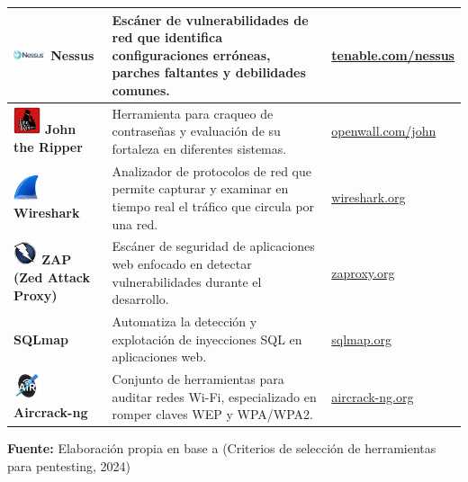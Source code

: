 \documentclass[a4paper, 10pt]{article}
\begin{document}
\begin{table}[H]
\begin{tabular}{|m{5cm}|m{8cm}|m{3.5cm}|}
        \hline
        \includegraphics[width=0.95cm]{images/nessus.png} \textbf{Nessus} & Escáner de vulnerabilidades de red que identifica configuraciones erróneas, parches faltantes y debilidades comunes. & \href{https://www.tenable.com/products/nessus}{tenable.com/nessus} \\
        \hline
        \includegraphics[width=0.8cm]{images/john.png} \textbf{John the Ripper} & Herramienta para craqueo de contraseñas y evaluación de su fortaleza en diferentes sistemas. & \href{https://www.openwall.com/john}{openwall.com/john} \\
        \hline
        \includegraphics[width=0.75cm]{images/wireshark.png} \textbf{Wireshark} & Analizador de protocolos de red que permite capturar y examinar en tiempo real el tráfico que circula por una red. & \href{https://www.wireshark.org}{wireshark.org} \\
        \hline
        \includegraphics[width=0.7cm]{images/zap.jpeg} \textbf{ZAP (Zed Attack Proxy)} & Escáner de seguridad de aplicaciones web enfocado en detectar vulnerabilidades durante el desarrollo. & \href{https://www.zaproxy.org}{zaproxy.org} \\
        \hline
        \textbf{SQLmap} & Automatiza la detección y explotación de inyecciones SQL en aplicaciones web. & \href{https://sqlmap.org}{sqlmap.org} \\
        \hline
        \includegraphics[width=0.8cm]{images/aircrack.jpeg} \textbf{Aircrack-ng} & Conjunto de herramientas para auditar redes Wi-Fi, especializado en romper claves WEP y WPA/WPA2. & \href{https://www.aircrack-ng.org}{aircrack-ng.org} \\
        \hline
        \end{tabular}
    \begin{flushleft}\centering
        \footnotesize \textbf{Fuente:} Elaboración propia en base a (Criterios de selección de herramientas para pentesting, 2024)
    \end{flushleft}
    \end{table}
\end{document}
